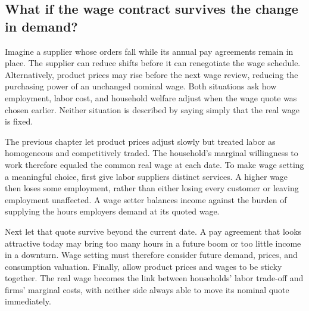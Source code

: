 %
%
%

\subsection{What if the wage contract survives the change in demand?}

Imagine a supplier whose orders fall while its annual pay agreements remain
in place. The supplier can reduce shifts before it can renegotiate the wage
schedule. Alternatively, product prices may rise before the next wage review,
reducing the purchasing power of an unchanged nominal wage. Both situations
ask how employment, labor cost, and household welfare adjust when the wage
quote was chosen earlier. Neither situation is described by saying simply
that the real wage is fixed.

The previous chapter let product prices adjust slowly but treated labor as
homogeneous and competitively traded. The household's marginal willingness to
work therefore equaled the common real wage at each date. To make wage setting
a meaningful choice, first give labor suppliers distinct services. A higher
wage then loses some employment, rather than either losing every customer or
leaving employment unaffected. A wage setter balances income against the
burden of supplying the hours employers demand at its quoted wage.

Next let that quote survive beyond the current date. A pay agreement that
looks attractive today may bring too many hours in a future boom or too little
income in a downturn. Wage setting must therefore consider future demand,
prices, and consumption valuation. Finally, allow product prices and wages to
be sticky together. The real wage becomes the link between households' labor
trade-off and firms' marginal costs, with neither side always able to move
its nominal quote immediately.

